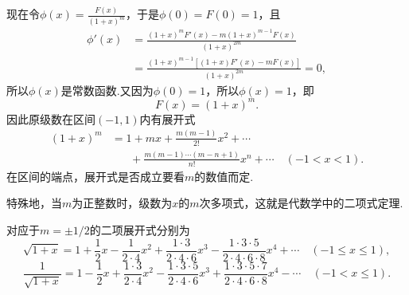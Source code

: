 \begin{example}
\begin{solution}
现在令\(\phi(x) = \frac{F(x)}{(1+x)^m}\)，于是\(\phi(0) = F(0) = 1\)，且\[
\begin{split}
\phi'(x)
&= \frac{(1+x)^m F'(x) - m(1+x)^{m-1} F(x)}{(1+x)^{2m}} \\
&= \frac{(1+x)^{m-1} [(1+x) F'(x) - m F(x)]}{(1+x)^{2m}}
= 0,
\end{split}
\]所以\(\phi(x)\)是常数函数.又因为\(\phi(0) = 1\)，所以\(\phi(x) = 1\)，即\[
F(x) = (1+x)^m.
\]因此原级数在区间\((-1,1)\)内有展开式\begin{equation}
\label{equation:无穷级数.二项展开式}
\begin{split}
(1+x)^m
&= 1+mx+\frac{m(m-1)}{2!}x^2+\dotsb \\
&\hspace{20pt} +\frac{m(m-1)\dotsm(m-n+1)}{n!}x^n+\dotsb
\quad(-1<x<1).
\end{split}
\end{equation}
在区间的端点，展开式是否成立要看\(m\)的数值而定.
\end{solution}
\end{example}

特殊地，当\(m\)为正整数时，级数为\(x\)的\(m\)次多项式，这就是代数学中的二项式定理.

对应于\(m=\pm1/2\)的二项展开式分别为\[
\sqrt{1+x}
= 1+\frac{1}{2}x-\frac{1}{2\cdot4}x^2+\frac{1\cdot3}{2\cdot4\cdot6}x^3-\frac{1\cdot3\cdot5}{2\cdot4\cdot6\cdot8}x^4+\dotsb
\quad(-1 \leq x \leq 1),
\]\[
\frac{1}{\sqrt{1+x}}
= 1-\frac{1}{2}x+\frac{1\cdot3}{2\cdot4}x^2-\frac{1\cdot3\cdot5}{2\cdot4\cdot6}x^3+\frac{1\cdot3\cdot5\cdot7}{2\cdot4\cdot6\cdot8}x^4-\dotsb
\quad(-1 < x \leq 1).
\]


